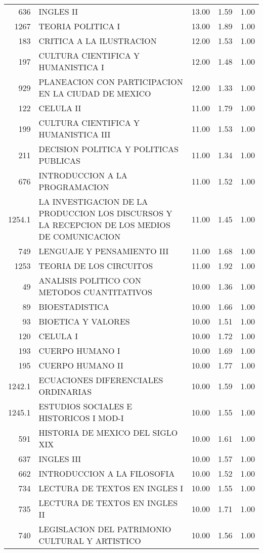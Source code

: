\documentclass[12pt]{article}
\begin{document}
\begin{table}[ht]
\begin{tabular}{rlrrr}
  636 & INGLES II & 13.00 & 1.59 & 1.00 \\ 
  1267 & TEORIA POLITICA I & 13.00 & 1.89 & 1.00 \\ 
  183 & CRITICA A LA ILUSTRACION & 12.00 & 1.53 & 1.00 \\ 
  197 & CULTURA CIENTIFICA Y HUMANISTICA I & 12.00 & 1.48 & 1.00 \\ 
  929 & PLANEACION CON PARTICIPACION EN LA CIUDAD DE MEXICO & 12.00 & 1.33 & 1.00 \\ 
  122 & CELULA II & 11.00 & 1.79 & 1.00 \\ 
  199 & CULTURA CIENTIFICA Y HUMANISTICA III & 11.00 & 1.53 & 1.00 \\ 
  211 & DECISION POLITICA Y POLITICAS PUBLICAS & 11.00 & 1.34 & 1.00 \\ 
  676 & INTRODUCCION A LA PROGRAMACION & 11.00 & 1.52 & 1.00 \\ 
  1254.1 & LA INVESTIGACION DE LA PRODUCCION LOS DISCURSOS Y LA RECEPCION DE LOS MEDIOS DE COMUNICACION & 11.00 & 1.45 & 1.00 \\ 
  749 & LENGUAJE Y PENSAMIENTO III & 11.00 & 1.68 & 1.00 \\ 
  1253 & TEORIA DE LOS CIRCUITOS & 11.00 & 1.92 & 1.00 \\ 
  49 & ANALISIS POLITICO CON METODOS CUANTITATIVOS & 10.00 & 1.36 & 1.00 \\ 
  89 & BIOESTADISTICA & 10.00 & 1.66 & 1.00 \\ 
  93 & BIOETICA Y VALORES & 10.00 & 1.51 & 1.00 \\ 
  120 & CELULA I & 10.00 & 1.72 & 1.00 \\ 
  193 & CUERPO HUMANO I & 10.00 & 1.69 & 1.00 \\ 
  195 & CUERPO HUMANO II & 10.00 & 1.77 & 1.00 \\ 
  1242.1 & ECUACIONES DIFERENCIALES ORDINARIAS & 10.00 & 1.59 & 1.00 \\ 
  1245.1 & ESTUDIOS SOCIALES E HISTORICOS I MOD-I & 10.00 & 1.55 & 1.00 \\ 
  591 & HISTORIA DE MEXICO DEL SIGLO XIX & 10.00 & 1.61 & 1.00 \\ 
  637 & INGLES III & 10.00 & 1.57 & 1.00 \\ 
  662 & INTRODUCCION A LA FILOSOFIA & 10.00 & 1.52 & 1.00 \\ 
  734 & LECTURA DE TEXTOS EN INGLES I & 10.00 & 1.55 & 1.00 \\ 
  735 & LECTURA DE TEXTOS EN INGLES II & 10.00 & 1.71 & 1.00 \\ 
  740 & LEGISLACION DEL PATRIMONIO CULTURAL Y ARTISTICO & 10.00 & 1.56 & 1.00 \\ 

\end{tabular}
\end{table}
\end{document}
